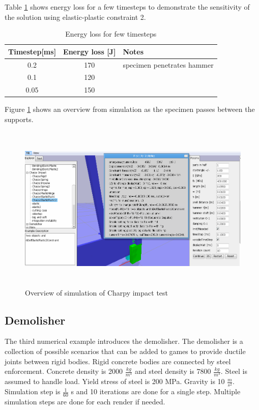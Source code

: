 Table \ref{tab:ep2ts} shows energy loss for a few timesteps to demonstrate the sensitivity of the solution
using  elastic-plastic constraint 2.

\begin {table}[htb!]
\caption {Energy loss for few timesteps}
\label{tab:ep2ts} 
\begin{center}
\begin{tabular}{| c| c|l|}
\hline
{\bf Timestep[ms]} & {\bf Energy loss [J]} & {\bf Notes} \\ \hline
 0.2 &  170 & specimen penetrates hammer  \\ \hline
 0.1 &  120 & \\ \hline
 0.05 &  150 & \\ \hline
\end {tabular}
\end{center}
\end {table}

Figure \ref{fig:charpy} shows an overview from simulation as the specimen passes between the supports.

\begin{figure}[htb!]
\centering
\includegraphics[height=8cm]{figs/article-charpy}
\caption{Overview of simulation of Charpy impact test}
\label{fig:charpy}
\end{figure}



\subsection{Demolisher}
The third numerical example introduces the demolisher.
The demolisher is a collection of possible scenarios that can be added to games to provide ductile joints between
rigid bodies.  Rigid concrete bodies are connected by steel enforcement.
Concrete density is 2000 $\frac{kg}{m^3}$ and steel density is 7800 $\frac{kg}{m^3}$. 
Steel is assumed to handle load. Yield stress of steel is 200 MPa.
Gravity is 10  $\frac{m}{s^2}$. Simulation step is $\frac{1}{60} $ s and 10 
iterations are done for a single step. Multiple simulation steps are done for each render if needed.

